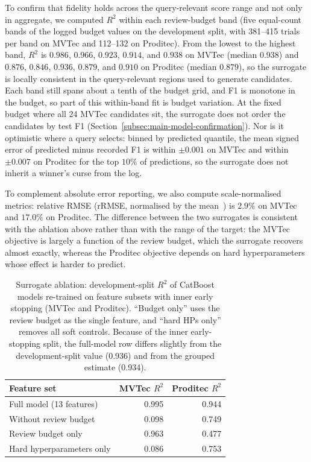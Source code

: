 \documentclass[final,5p,times,twocolumn]{elsarticle}
\begin{document}
To confirm that fidelity holds across the query-relevant score range
and not only in aggregate, we computed $R^2$ within each review-budget
band (five equal-count bands of the logged budget values on the development split, with 381--415 trials per band on MVTec and 112--132 on Proditec). From the lowest to the highest band, $R^2$ is $0.986$, $0.966$, $0.923$, $0.914$, and $0.938$ on MVTec (median $0.938$) and $0.876$, $0.846$, $0.936$, $0.879$, and $0.910$ on Proditec (median $0.879$), so the surrogate is locally consistent in the query-relevant regions used to generate candidates. Each band still spans about a tenth of the budget grid, and F1 is monotone in the budget, so part of this within-band fit is budget variation. At the fixed budget where all 24 MVTec candidates sit, the surrogate does not order the candidates by test F1 (Section~\ref{subsec:main-model-confirmation}). Nor is it optimistic where a query selects: binned by predicted quantile, the
mean signed error of predicted minus recorded F1 is within $\pm 0.001$
on MVTec and within $\pm 0.007$ on Proditec for the top $10\%$ of
predictions, so the surrogate does not inherit a winner's curse from
the log.

To complement absolute error reporting, we also compute scale-normalised
metrics: relative RMSE (rRMSE, normalised by the mean~\cite{jin2024officegpr}) is $2.9\%$ on MVTec and $17.0\%$ on Proditec. The difference between the two surrogates is consistent with the ablation above rather than with the range of the target: the MVTec objective is largely a function of the review budget, which the surrogate recovers almost exactly, whereas the Proditec objective depends on hard hyperparameters whose effect is harder to predict.

\begin{table}[!t]
\centering
\footnotesize
\caption{Surrogate ablation: development-split $R^2$ of CatBoost models
re-trained on feature subsets with inner early stopping (MVTec and
Proditec). ``Budget only'' uses the review budget as the single feature, and ``hard HPs only'' removes all soft controls. Because of the inner
early-stopping split, the full-model row differs slightly from the development-split value (0.936) and from the grouped estimate (0.934).}
\label{tab:surrogate-ablation}
\setlength{\tabcolsep}{3pt}
\begin{tabular}{@{}lrr@{}}
\toprule
Feature set & MVTec $R^2$ & Proditec $R^2$ \\
\midrule
Full model (13 features)    & 0.995 & 0.944 \\
Without review budget       & 0.098 & 0.749 \\
Review budget only          & 0.963 & 0.477 \\
Hard hyperparameters only   & 0.086 & 0.753 \\
\bottomrule
\end{tabular}
\end{table}
\end{document}
